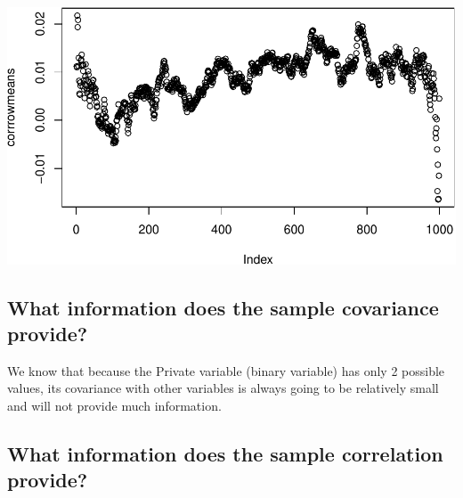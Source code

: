 \documentclass[
]{article}
\begin{document}
\includegraphics{./figures/unnamed-chunk-10-2.pdf}

\hypertarget{what-information-does-the-sample-covariance-provide}{%
\subsection{What information does the sample covariance
provide?}\label{what-information-does-the-sample-covariance-provide}}

We know that because the Private variable (binary variable) has only 2
possible values, its covariance with other variables is always going to
be relatively small and will not provide much information.

\newpage

\hypertarget{what-information-does-the-sample-correlation-provide}{%
\subsection{What information does the sample correlation
provide?}\label{what-information-does-the-sample-correlation-provide}}
\end{document}
